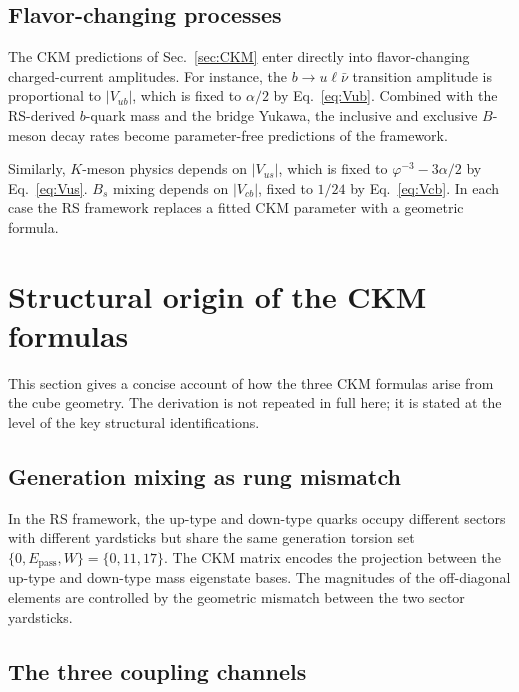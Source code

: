 \documentclass[11pt]{article}
\theoremstyle{remark}
\newcommand{\phig}{\varphi}
\newcommand{\Epass}{E_{\mathrm{pass}}}
\begin{document}
\subsection{Flavor-changing processes}

The CKM predictions of Sec.~\ref{sec:CKM} enter directly
into flavor-changing charged-current amplitudes.  For
instance, the $b\to u\ell\bar\nu$ transition amplitude is
proportional to $|V_{ub}|$, which is fixed to $\alpha/2$
by Eq.~\eqref{eq:Vub}.  Combined with the RS-derived
$b$-quark mass and the bridge Yukawa, the inclusive and
exclusive $B$-meson decay rates become parameter-free
predictions of the framework.

Similarly, $K$-meson physics depends on $|V_{us}|$, which
is fixed to $\phig^{-3}-3\alpha/2$ by Eq.~\eqref{eq:Vus}.
$B_s$ mixing depends on $|V_{cb}|$, fixed to $1/24$ by
Eq.~\eqref{eq:Vcb}.  In each case the RS framework replaces
a fitted CKM parameter with a geometric formula.

\section{Structural origin of the CKM formulas}
\label{sec:origin}

This section gives a concise account of how the three CKM
formulas arise from the cube geometry.  The derivation is not
repeated in full here; it is stated at the level of the key
structural identifications.

\subsection{Generation mixing as rung mismatch}

In the RS framework, the up-type and down-type quarks occupy
different sectors with different yardsticks but share the same
generation torsion set $\{0,\Epass,W\}=\{0,11,17\}$.  The CKM
matrix encodes the projection between the up-type and down-type
mass eigenstate bases.  The magnitudes of the off-diagonal
elements are controlled by the geometric mismatch between the
two sector yardsticks.

\subsection{The three coupling channels}
\end{document}
